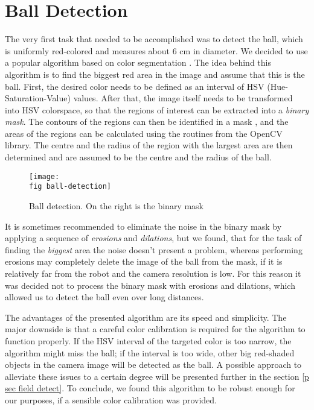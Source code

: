 \section{Ball Detection}
\label{p sec ball detection}

The very first task that needed to be accomplished was to detect the ball,
which is uniformly red-colored and measures about 6 cm in diameter. We decided
to use a popular algorithm based on color segmentation \cite{ball-detect}. The
idea behind this algorithm is to find the biggest red area in the image and
assume that this is the ball. First, the desired color needs to be defined as
an interval of HSV (Hue-Saturation-Value) \cite{hsv} values. After that, the
image itself needs to be transformed into HSV colorspace, so that the regions
of interest can be extracted into a \textit{binary mask}. The contours of the
regions can then be identified in a mask \cite{contours}, and the areas of the
regions can be calculated using the routines from the OpenCV library. The
centre and the radius of the region with the largest area are then determined
and are assumed to be the centre and the radius of the ball.

\begin{figure}[ht]
  \texttt{[image: \\fig ball-detection]}
  \caption[Ball detection]{Ball detection. On the right is the binary mask}
  \label{p figure ball-detection}
\end{figure}

It is sometimes recommended \cite{ball-detect} to eliminate the noise in the
binary mask by applying a sequence of \textit{erosions} and \textit{dilations},
but we found, that for the task of finding the \textit{biggest} area the noise
doesn't present a problem, whereas performing erosions may completely delete
the image of the ball from the mask, if it is relatively far from the robot and
the camera resolution is low. For this reason it was decided not to process the
binary mask with erosions and dilations, which allowed us to detect the ball
even over long distances.

The advantages of the presented algorithm are its speed and simplicity. The
major downside is that a careful color calibration is required for the
algorithm to function properly. If the HSV interval of the targeted color is
too narrow, the algorithm might miss the ball; if the interval is too
wide, other big red-shaded objects in the camera image will be detected as
the ball. A possible approach to alleviate these issues to a certain degree
will be presented further in the section \ref{p sec field detect}. To
conclude, we found this algorithm to be robust enough for our purposes, if a
sensible color calibration was provided.

